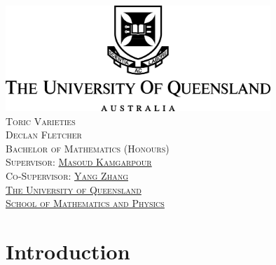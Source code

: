 \documentclass[12pt]{amsart}
\theoremstyle{plain}
\begin{document}

\begin{center}
\includegraphics[width=10cm]{../images/UQLogo.jpg} \\ 
\vspace{3cm}
{\LARGE\textsc{Toric Varieties}} \\
\vspace{0.5cm}
{\textsc{Declan Fletcher}} \\
\vspace{8cm}
{\textsc{ Bachelor of Mathematics (Honours)}} \\
\vspace{1cm}
{\textsc{Supervisor: \href{https://sites.google.com/site/masoudkomi/home}{Masoud Kamgarpour}}} \\
{\textsc{Co-Supervisor: \href{https://sites.google.com/site/yangzhang139/home}{Yang Zhang}}} \\
\vspace{1cm}
{\textsc{\href{https://www.uq.edu.au/}{The University of Queensland}}} \\
{\textsc{\href{https://smp.uq.edu.au/}{School of Mathematics and Physics}}}
\end{center}


\newpage
\tableofcontents


\newpage
{}
\section{Introduction}
\end{document}

